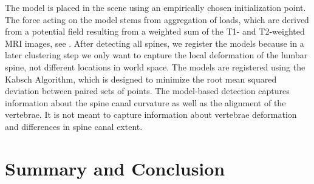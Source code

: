 \documentclass[journal]{style/vgtc}           %
\begin{document}
The model is placed in the scene using an empirically chosen initialization point. The force acting on the model stems from aggregation of loads, which are derived from a potential field resulting from a weighted sum of the T1- and T2-weighted MRI images, see \cite{Rak2013}. After detecting all spines, we register the models because in a later clustering step we only want to capture the local deformation of the lumbar spine, not different locations in world space. The models are registered using the Kabsch Algorithm, which is designed to minimize the root mean squared deviation between paired sets of points.
The model-based detection captures information about the spine canal curvature as well as the alignment of the vertebrae. It is not meant to capture information about vertebrae deformation and differences in spine canal extent.

\section{Summary and Conclusion}




\end{document}
